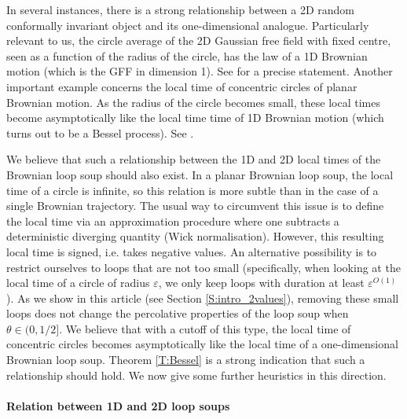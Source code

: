 \documentclass[11pt]{article}
\theoremstyle{remark}
\newcommand{\eps}{\varepsilon}
\numberwithin{equation}{section}
\begin{document}
In several instances, there is a strong relationship between a 2D random conformally invariant object and its one-dimensional analogue. Particularly relevant to us, the circle average of the 2D Gaussian free field with fixed centre, seen as a function of the radius of the circle, has the law of a 1D Brownian motion (which is the GFF in dimension 1). See \cite[Section 2.8]{MR2322706} for a precise statement. Another important example concerns the local time of concentric circles of planar Brownian motion. As the radius of the circle becomes small, these local times become asymptotically like the local time time of 1D Brownian motion (which turns out to be a Bessel process). See \cite{jegoBMC, jegoCritical}.

We believe that such a relationship between the 1D and 2D local times of the Brownian loop soup should also exist. In a planar Brownian loop soup, the local time of a circle is infinite, so this relation is more subtle than in the case of a single Brownian trajectory.
The usual way to circumvent this issue is to define the local time via an approximation procedure where one subtracts a deterministic diverging quantity (Wick normalisation). However, this resulting local time is signed, i.e. takes negative values.
An alternative possibility is to restrict ourselves to loops that are not too small (specifically, when looking at the local time of a circle of radius $\eps$, we only keep loops with duration at least $\eps^{O(1)}$). As we show in this article (see Section \ref{S:intro_2values}), removing these small loops does not change the percolative properties of the loop soup when $\theta \in (0,1/2]$. We believe that with a cutoff of this type, the local time of concentric circles becomes asymptotically like the local time of a one-dimensional Brownian loop soup. Theorem \ref{T:Bessel} is a strong indication that such a relationship should hold. We now give some further heuristics in this direction.

\paragraph*{Relation between 1D and 2D loop soups}
\end{document}
